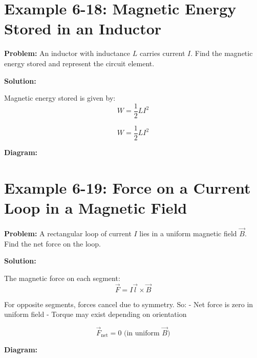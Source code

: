 \documentclass[12pt]{article}
\begin{document}
\section*{Example 6-18: Magnetic Energy Stored in an Inductor}

\textbf{Problem:}  
An inductor with inductance \( L \) carries current \( I \). Find the magnetic energy stored and represent the circuit element.

\textbf{Solution:}

Magnetic energy stored is given by:
\[
W = \frac{1}{2} L I^2
\]

\begin{tcolorbox}
\[
\boxed{W = \frac{1}{2} L I^2}
\]
\end{tcolorbox}

\textbf{Diagram:}
\begin{center}
\end{center}



\section*{Example 6-19: Force on a Current Loop in a Magnetic Field}

\textbf{Problem:}  
A rectangular loop of current \( I \) lies in a uniform magnetic field \( \vec{B} \). Find the net force on the loop.

\textbf{Solution:}

The magnetic force on each segment:
\[
\vec{F} = I \vec{l} \times \vec{B}
\]

For opposite segments, forces cancel due to symmetry. So:
- Net force is zero in uniform field
- Torque may exist depending on orientation

\begin{tcolorbox}
\[
\boxed{\vec{F}_{\text{net}} = 0 \text{ (in uniform } \vec{B} \text{)}}
\]
\end{tcolorbox}

\textbf{Diagram:}
\begin{center}
\end{center}
\end{document}
